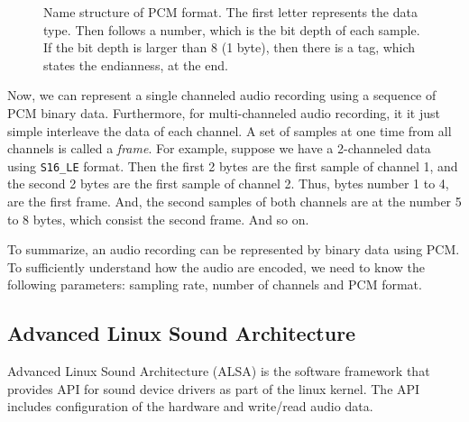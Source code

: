 \documentclass[11pt,a4paper]{report}
\begin{document}
\begin{figure}[htpb]
\begin{center}
\end{center}
\caption[Name structure of PCM format.]{Name structure of PCM format. The first letter represents the data type. Then follows a number, which is the bit depth of each sample. If the bit depth is larger than 8 (1 byte), then there is a tag, which states the endianness, at the end.}
  \label{fig:pcmname}
\end{figure}

Now, we can represent a single channeled audio recording using a sequence of PCM binary data. Furthermore, for multi-channeled audio recording, it it just simple interleave the data of each channel. A set of samples at one time from all channels is called a \textit{frame}. For example, suppose we have a 2-channeled data using \texttt{S16\_LE} format. Then the first 2 bytes are the first sample of channel 1, and the second 2 bytes are the first sample of channel 2. Thus, bytes number 1 to 4, are the first frame. And, the second samples of both channels are at the number 5 to 8 bytes, which consist the second frame. And so on.

To summarize, an audio recording can be represented by binary data using PCM. To sufficiently understand how the audio are encoded, we need to know the following parameters: sampling rate, number of channels and PCM format.

\subsection{Advanced Linux Sound Architecture}
Advanced Linux Sound Architecture (ALSA) is the software framework that provides API for sound device drivers as part of the linux kernel. The API includes configuration of the hardware and write/read audio data.
\end{document}
